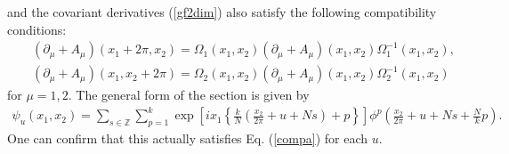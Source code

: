 \documentclass[a4paper,epsf,12pt]{article}
\newcommand{\Z}{{\mathbb{Z}}}
\newcommand{\del}{\partial}
\newcommand{\fr}{\frac}
\begin{document}
and the covariant derivatives (\ref{gf2dim}) also satisfy the 
following compatibility conditions: 
\begin{eqnarray*}
&&(\partial_\mu+A_\mu)(x_1+2\pi,x_2)
=\Omega_1(x_1,x_2)(\partial_\mu+A_\mu)(x_1,x_2)\Omega^{-1}_1(x_1,x_2),\\
&&(\partial_\mu+A_\mu)(x_1,x_2+2\pi)
=\Omega_2(x_1,x_2)(\partial_\mu+A_\mu)(x_1,x_2)\Omega^{-1}_2(x_1,x_2)
\end{eqnarray*}
for $\mu=1, 2$. 
The general form of the section is given by \cite{GRT, Ho, MoZu}
\begin{eqnarray}
\label{general}
\psi_u(x_1,x_2)=\sum_{s\in \Z}\sum_{p=1}^{k}
\exp\left[ix_1 \left\{
\fr{k}{N}\left(\fr{x_2}{2\pi}+u+Ns\right)+p\right\}\right]
\phi^p\left(\frac{x_2}{2\pi}+u+Ns+\fr{N}{k}p\right).
\end{eqnarray}
One can confirm that this actually satisfies Eq. (\ref{compa}) 
for each $u$.
\end{document}
